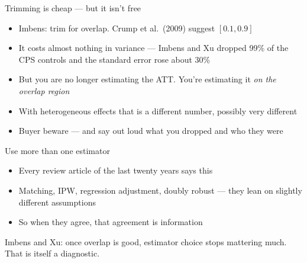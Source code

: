 \documentclass{beamer}
\newcommand{\deemph}[1]{\textcolor{warmgray}{\small #1}}
\begin{document}
\begin{frame}{Trimming is cheap --- but it isn't free}

\begin{itemize}
\item Imbens: trim for overlap. Crump et al.\ (2009) suggest $[0.1, 0.9]$
\item It costs almost nothing in variance --- Imbens and Xu dropped 99\% of the CPS
      controls and the standard error rose about 30\%
\end{itemize}

\vspace{0.7em}

\begin{itemize}
\item But you are no longer estimating the ATT. You're estimating it \emph{on the overlap region}
\item With heterogeneous effects that is a different number, possibly very different
\item Buyer beware --- and say out loud what you dropped and who they were
\end{itemize}

\end{frame}


\begin{frame}{Use more than one estimator}

\begin{itemize}
\item Every review article of the last twenty years says this
\item Matching, IPW, regression adjustment, doubly robust --- they lean on slightly different assumptions
\item So when they agree, that agreement is information
\end{itemize}

\vspace{0.7em}

\deemph{Imbens and Xu: once overlap is good, estimator choice stops mattering much. That is itself a diagnostic.}

\end{frame}
\end{document}
